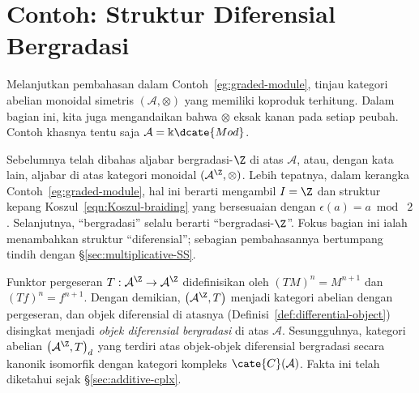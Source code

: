 
\section{Contoh: Struktur Diferensial Bergradasi}\label{sec:dga-monoidal}
\hypertarget{o014.aljabr2.chapter7.differential-graded-structures}{ }
Melanjutkan pembahasan dalam Contoh~\ref{eg:graded-module}, tinjau kategori
abelian monoidal simetris $(\mathcal{A}, \otimes)$ yang memiliki koproduk
terhitung. Dalam bagian ini, kita juga mengandaikan bahwa $\otimes$ eksak
kanan pada setiap peubah. Contoh khasnya tentu saja
$\mathcal{A}=\Bbbk\dcate{Mod}$.

Sebelumnya telah dibahas aljabar bergradasi-$\Z$ di atas $\mathcal{A}$, atau,
dengan kata lain, aljabar di atas kategori monoidal
$(\mathcal{A}^{\Z},\otimes)$. Lebih tepatnya, dalam kerangka
Contoh~\ref{eg:graded-module}, hal ini berarti mengambil $I=\Z$ dan struktur
kepang Koszul~\eqref{eqn:Koszul-braiding} yang bersesuaian dengan
$\epsilon(a)=a\bmod\;2$. Selanjutnya, ``bergradasi'' selalu berarti
``bergradasi-$\Z$''. Fokus bagian ini ialah menambahkan struktur
``diferensial''; sebagian pembahasannya bertumpang tindih dengan
\S\ref{sec:multiplicative-SS}.

Funktor pergeseran $T:\mathcal{A}^{\Z}\to\mathcal{A}^{\Z}$ didefinisikan
oleh $(TM)^n=M^{n+1}$ dan $(Tf)^n=f^{n+1}$. Dengan demikian,
$\left(\mathcal{A}^{\Z},T\right)$ menjadi kategori abelian dengan pergeseran,
dan objek diferensial di atasnya (Definisi~\ref{def:differential-object})
disingkat menjadi \emph{objek diferensial bergradasi} di atas $\mathcal{A}$.
Sesungguhnya, kategori abelian
$\left(\mathcal{A}^{\Z},T\right)_d$ yang terdiri atas objek-objek diferensial
bergradasi secara kanonik isomorfik dengan kategori kompleks
$\cate{C}(\mathcal{A})$. Fakta ini telah diketahui sejak
\S\ref{sec:additive-cplx}.


